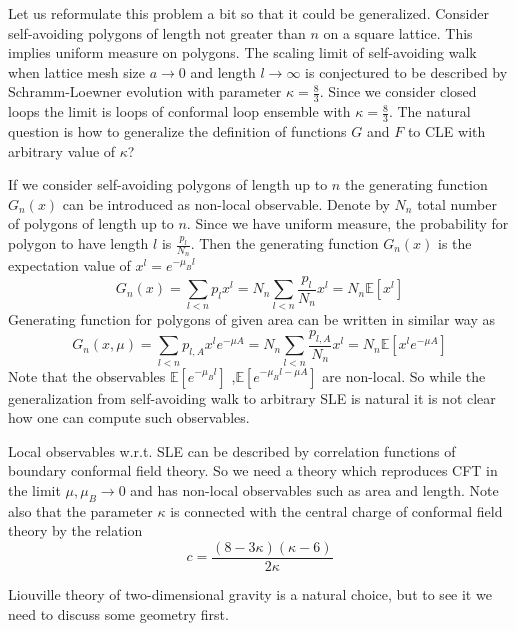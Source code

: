\documentclass[12pt]{article}
\begin{document}
Let us reformulate this problem a bit so that it could be generalized. Consider self-avoiding
polygons of length not greater than $n$ on a square lattice. This implies uniform measure on
polygons. The scaling limit of self-avoiding walk when lattice mesh size $a\to 0$ and length $l\to
\infty$ is conjectured to be described by Schramm-Loewner evolution with parameter
$\kappa=\frac{8}{3}$. Since we consider closed loops the limit is loops of conformal loop ensemble
with $\kappa=\frac{8}{3}$.
The natural question is how to generalize the definition of functions $G$ and $F$ to CLE with
arbitrary value of $\kappa$?

If we consider self-avoiding polygons of length up to $n$ the generating function $G_{n}(x)$ can be
introduced as non-local observable. Denote by $N_{n}$ total number of polygons of length up to $n$.
Since we have uniform measure, the probability for polygon to have length $l$ is
$\frac{p_{l}}{N_{n}}$. Then the generating function $G_{n}(x)$ is the expectation value of $x^{l}=e^{-\mu_{B}l}$
\begin{equation}
  \label{eq:102}
  G_{n}(x)=\sum_{l<n} p_{l} x^{l} = N_{n} \sum_{l<n} \frac{p_{l}}{N_{n}} x^{l} = N_{n}\mathbb{E}[x^{l}]
\end{equation}
Generating function for polygons of given area can be written in similar way as
\begin{equation}
  \label{eq:103}
   G_{n}(x,\mu)=\sum_{l<n} p_{l,A} x^{l} e^{-\mu A} = N_{n} \sum_{l<n} \frac{p_{l,A}}{N_{n}} x^{l} =
   N_{n}\mathbb{E}[x^{l} e^{-\mu A}]
\end{equation}
Note that the  observables $\mathbb{E}[e^{-\mu_{B}l}]$ ,$\mathbb{E}[e^{-\mu_{B}l -\mu A}]$ are
non-local. So while the generalization from self-avoiding walk to arbitrary SLE is natural it is not
clear how one can compute such observables.

Local observables w.r.t. SLE can be described by correlation functions of boundary conformal field
theory. So we need a theory which reproduces CFT in the limit $\mu,\mu_{B}\to 0$ and has non-local
observables such as area and length. Note also that the parameter $\kappa$ is connected with the
central charge of conformal field theory by the relation
\begin{equation}
  \label{eq:113}
  c=\frac{(8-3\kappa)(\kappa-6)}{2\kappa}
\end{equation}


Liouville theory of two-dimensional gravity is a natural choice, but to see it we need to discuss
some geometry first. 
\end{document}

